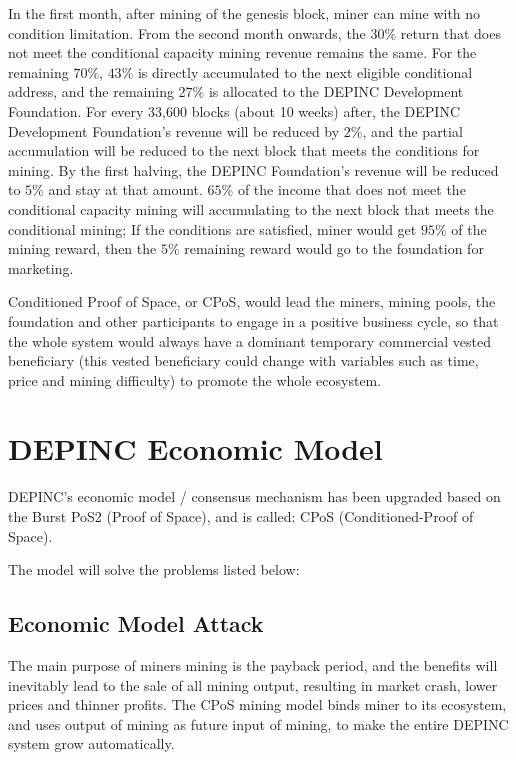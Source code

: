 \begin{flushleft}
    In the first month, after mining of the genesis block, miner can mine with no condition limitation. From the second month onwards, the $30\%$ return that does not meet the conditional capacity mining revenue remains the same. For the remaining $70\%$, $43\%$ is directly accumulated to the next eligible conditional address, and the remaining $27\%$ is allocated to the DEPINC Development Foundation. For every 33,600 blocks (about 10 weeks) after, the DEPINC Development Foundation's revenue will be reduced by $2\%$, and the partial accumulation will be reduced to the next block that meets the conditions for mining. By the first halving, the DEPINC Foundation's revenue will be reduced to $5\%$ and stay at that amount. $65\%$ of the income that does not meet the conditional capacity mining will accumulating to the next block that meets the conditional mining; If the conditions are satisfied, miner would get $95\%$ of the mining reward, then the $5\%$ remaining reward would go to the foundation for marketing.
\end{flushleft}
\begin{flushleft}
    Conditioned Proof of Space, or CPoS, would lead the miners, mining pools, the foundation and other participants to engage in a positive business cycle, so that the whole system would always have a dominant temporary commercial vested beneficiary (this vested beneficiary could change with variables such as time, price and mining difficulty) to promote the whole ecosystem.
\end{flushleft}
\section{DEPINC Economic Model}
\begin{flushleft}
    DEPINC's economic model / consensus mechanism has been upgraded based on the Burst PoS2 (Proof of Space), and is called: CPoS (Conditioned-Proof of Space).
\end{flushleft}
\begin{flushleft}
    The model will solve the problems listed below:
\end{flushleft}
\subsection{Economic Model Attack}
\begin{flushleft}
    The main purpose of miners mining is the payback period, and the benefits will inevitably lead to the sale of all mining output, resulting in market crash, lower prices and thinner profits. The CPoS mining model binds miner to its ecosystem, and uses output of mining as future input of mining, to make the entire DEPINC system grow automatically.
\end{flushleft}
